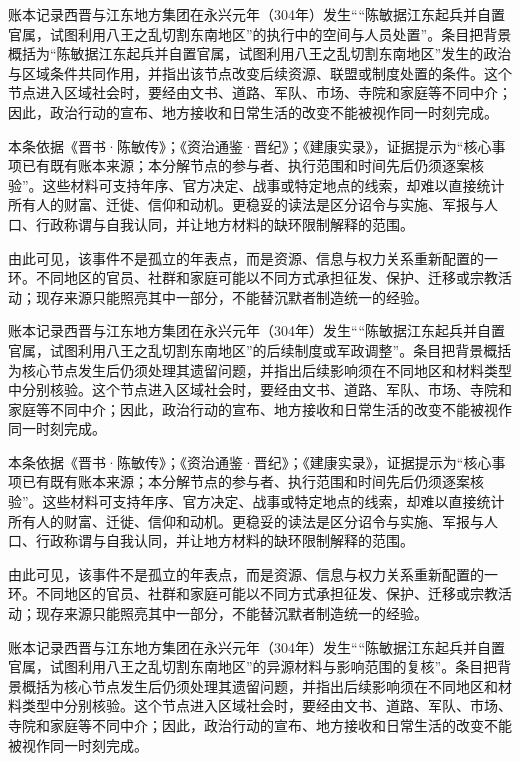 账本记录西晋与江东地方集团在永兴元年（304年）发生““陈敏据江东起兵并自置官属，试图利用八王之乱切割东南地区”的执行中的空间与人员处置”。条目把背景概括为“陈敏据江东起兵并自置官属，试图利用八王之乱切割东南地区”发生的政治与区域条件共同作用，并指出该节点改变后续资源、联盟或制度处置的条件。这个节点进入区域社会时，要经由文书、道路、军队、市场、寺院和家庭等不同中介；因此，政治行动的宣布、地方接收和日常生活的改变不能被视作同一时刻完成。

本条依据《晋书·陈敏传》；《资治通鉴·晋纪》；《建康实录》，证据提示为“核心事项已有既有账本来源；本分解节点的参与者、执行范围和时间先后仍须逐案核验”。这些材料可支持年序、官方决定、战事或特定地点的线索，却难以直接统计所有人的财富、迁徙、信仰和动机。更稳妥的读法是区分诏令与实施、军报与人口、行政称谓与自我认同，并让地方材料的缺环限制解释的范围。

由此可见，该事件不是孤立的年表点，而是资源、信息与权力关系重新配置的一环。不同地区的官员、社群和家庭可能以不同方式承担征发、保护、迁移或宗教活动；现存来源只能照亮其中一部分，不能替沉默者制造统一的经验。

账本记录西晋与江东地方集团在永兴元年（304年）发生““陈敏据江东起兵并自置官属，试图利用八王之乱切割东南地区”的后续制度或军政调整”。条目把背景概括为核心节点发生后仍须处理其遗留问题，并指出后续影响须在不同地区和材料类型中分别核验。这个节点进入区域社会时，要经由文书、道路、军队、市场、寺院和家庭等不同中介；因此，政治行动的宣布、地方接收和日常生活的改变不能被视作同一时刻完成。

本条依据《晋书·陈敏传》；《资治通鉴·晋纪》；《建康实录》，证据提示为“核心事项已有既有账本来源；本分解节点的参与者、执行范围和时间先后仍须逐案核验”。这些材料可支持年序、官方决定、战事或特定地点的线索，却难以直接统计所有人的财富、迁徙、信仰和动机。更稳妥的读法是区分诏令与实施、军报与人口、行政称谓与自我认同，并让地方材料的缺环限制解释的范围。

由此可见，该事件不是孤立的年表点，而是资源、信息与权力关系重新配置的一环。不同地区的官员、社群和家庭可能以不同方式承担征发、保护、迁移或宗教活动；现存来源只能照亮其中一部分，不能替沉默者制造统一的经验。

账本记录西晋与江东地方集团在永兴元年（304年）发生““陈敏据江东起兵并自置官属，试图利用八王之乱切割东南地区”的异源材料与影响范围的复核”。条目把背景概括为核心节点发生后仍须处理其遗留问题，并指出后续影响须在不同地区和材料类型中分别核验。这个节点进入区域社会时，要经由文书、道路、军队、市场、寺院和家庭等不同中介；因此，政治行动的宣布、地方接收和日常生活的改变不能被视作同一时刻完成。

